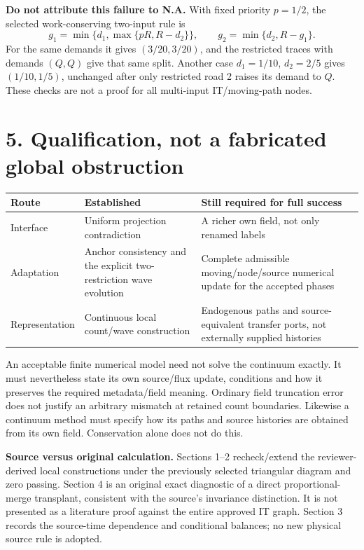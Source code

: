 \documentclass[11pt,a4paper]{article}
\begin{document}
\textbf{Do not attribute this failure to N.A.} With fixed priority $p=1/2$,
the selected work-conserving two-input rule is
\begin{equation}
 g_1=\min\{d_1,\max\{pR,R-d_2\}\},\qquad
 g_2=\min\{d_2,R-g_1\}.
\end{equation}
For the same demands it gives $(3/20,3/20)$, and the restricted traces with
demands $(Q,Q)$ give that same split. Another case $d_1=1/10$, $d_2=2/5$
gives $(1/10,1/5)$, unchanged after only restricted road 2 raises its demand
to $Q$. These checks are not a proof for all multi-input IT/moving-path nodes.

\newpage
\section*{5. Qualification, not a fabricated global obstruction}
\begin{center}
\begin{tabular}{>{\raggedright\arraybackslash}p{}>{\raggedright\arraybackslash}p{}>{\raggedright\arraybackslash}p{}}
\toprule
Route & Established & Still required for full success\\
\midrule
Interface & Uniform projection contradiction & A richer own field, not only renamed labels\\
Adaptation & Anchor consistency and the explicit two-restriction wave evolution & Complete admissible moving/node/source numerical update for the accepted phases\\
Representation & Continuous local count/wave construction & Endogenous paths and source-equivalent transfer ports, not externally supplied histories\\
\bottomrule
\end{tabular}
\end{center}

An acceptable finite numerical model need not solve the continuum exactly.
It must nevertheless state its own source/flux update, conditions and how it
preserves the required metadata/field meaning. Ordinary field truncation error
does not justify an arbitrary mismatch at retained count boundaries.
Likewise a continuum method must specify how its paths and source histories
are obtained from its own field. Conservation alone does not do this.

\textbf{Source versus original calculation.} Sections 1--2 recheck/extend
the reviewer-derived local constructions under the previously selected
triangular diagram and zero passing. Section 4 is an original exact diagnostic
of a direct proportional-merge transplant, consistent with the source's
invariance distinction. It is not presented as a literature proof against
the entire approved IT graph. Section 3 records the source-time dependence
and conditional balances; no new physical source rule is adopted.
\end{document}
